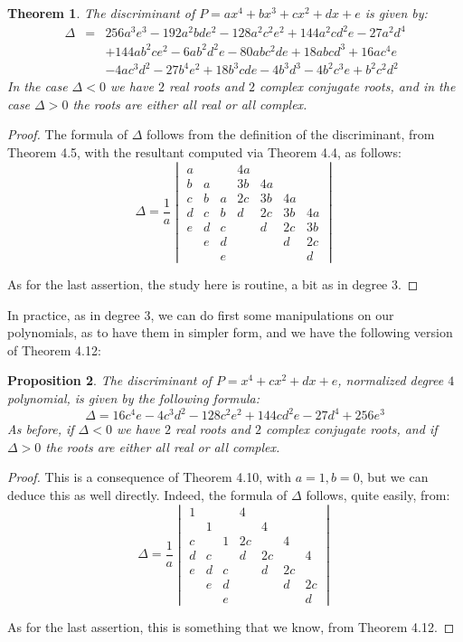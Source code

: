 \documentclass[12pt]{amsbook}
\newtheorem{theorem}{Theorem}[chapter]
\newtheorem{proposition}[theorem]{Proposition}
\begin{document}

\begin{theorem}
The discriminant of $P=ax^4+bx^3+cx^2+dx+e$ is given by:
\begin{eqnarray*}
\Delta
&=&256a^3e^3-192a^2bde^2-128a^2c^2e^2+144a^2cd^2e-27a^2d^4\\
&&+144ab^2ce^2-6ab^2d^2e-80abc^2de+18abcd^3+16ac^4e\\
&&-4ac^3d^2-27b^4e^2+18b^3cde-4b^3d^3-4b^2c^3e+b^2c^2d^2
\end{eqnarray*}
In the case $\Delta<0$ we  have $2$ real roots and $2$ complex conjugate roots, and in the case $\Delta>0$ the roots are either all real or all complex.
\end{theorem}

\begin{proof}
The formula of $\Delta$ follows from the definition of the discriminant, from Theorem 4.5, with the resultant computed via Theorem 4.4, as follows:
$$\Delta
=\frac{1}{a}\begin{vmatrix}
a&&&4a\\
b&a&&3b&4a\\
c&b&a&2c&3b&4a\\
d&c&b&d&2c&3b&4a\\
e&d&c&&d&2c&3b\\
&e&d&&&d&2c\\
&&e&&&&d
\end{vmatrix}$$

As for the last assertion, the study here is routine, a bit as in degree 3.
\end{proof}

In practice, as in degree 3, we can do first some manipulations on our polynomials, as to have them in simpler form, and we have the following version of Theorem 4.12:

\begin{proposition}
The discriminant of $P=x^4+cx^2+dx+e$, normalized degree $4$ polynomial, is given by the following formula:
$$\Delta=16c^4e-4c^3d^2-128c^2e^2+144cd^2e-27d^4+256e^3$$
As before, if $\Delta<0$ we  have $2$ real roots and $2$ complex conjugate roots, and if $\Delta>0$ the roots are either all real or all complex.
\end{proposition}

\begin{proof}
This is a consequence of Theorem 4.10, with $a=1,b=0$, but we can deduce this as well directly. Indeed, the formula of $\Delta$ follows, quite easily, from:
$$\Delta
=\frac{1}{a}\begin{vmatrix}
1&&&4\\
&1&&&4\\
c&&1&2c&&4\\
d&c&&d&2c&&4\\
e&d&c&&d&2c&\\
&e&d&&&d&2c\\
&&e&&&&d
\end{vmatrix}$$

As for the last assertion, this is something that we know, from Theorem 4.12.
\end{proof}
\end{document}
